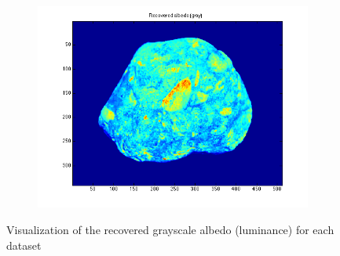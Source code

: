 \documentclass{paper}
\begin{document}
\begin{figure}[h!]
\begin{subfigure}{0.3\textwidth}
        \includegraphics[width=\textwidth]{results/rock/rock_rec_a}
    \end{subfigure}
    \caption{Visualization of the recovered grayscale albedo (luminance) for each dataset}
    \label{fig:rec_albedo}       
\end{figure}
\end{document}
